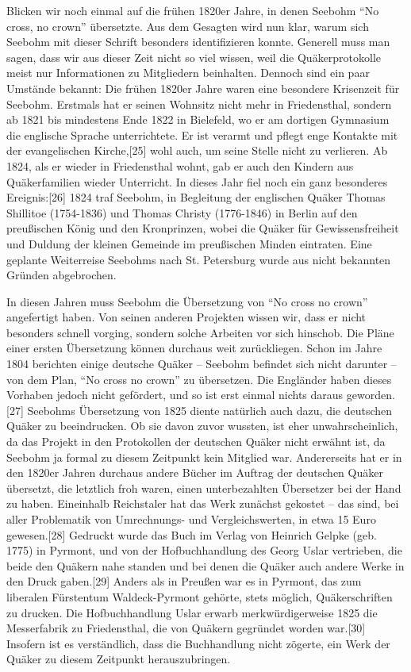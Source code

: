 \medskip

Blicken wir noch einmal auf die frühen 1820er Jahre, in denen Seebohm "`No
cross, no crown"' übersetzte. Aus dem Gesagten wird nun klar, warum sich Seebohm
mit dieser Schrift besonders identifizieren konnte. Generell muss man sagen,
dass wir aus dieser Zeit nicht so viel wissen, weil die Quäkerprotokolle meist
nur Informationen zu Mitgliedern beinhalten. Dennoch sind ein paar Umstände
bekannt: Die frühen 1820er Jahre waren eine besondere Krisenzeit für Seebohm.
Erstmals hat er seinen Wohnsitz nicht mehr in Friedensthal, sondern ab 1821 bis
mindestens Ende 1822 in Bielefeld, wo er am dortigen Gymnasium die englische
Sprache unterrichtete. Er ist verarmt und pflegt enge Kontakte mit der
evangelischen Kirche,[25] wohl auch, um seine Stelle nicht zu verlieren. Ab
1824, als er wieder in Friedensthal wohnt, gab er auch den Kindern aus
Quäkerfamilien wieder Unterricht. In dieses Jahr fiel noch ein ganz besonderes
Ereignis:[26] 1824 traf Seebohm, in Begleitung der englischen Quäker Thomas
Shillitoe (1754-1836) und Thomas Christy (1776-1846) in Berlin auf den
preußischen König und den Kronprinzen, wobei die Quäker für Gewissensfreiheit
und Duldung der kleinen Gemeinde im preußischen Minden eintraten. Eine geplante
Weiterreise Seebohms nach St. Petersburg wurde aus nicht bekannten Gründen
abgebrochen.

\medskip

In diesen Jahren muss Seebohm die Übersetzung von "`No cross no crown"'
angefertigt haben. Von seinen anderen Projekten wissen wir, dass er nicht
besonders schnell vorging, sondern solche Arbeiten vor sich hinschob. Die Pläne
einer ersten Übersetzung können durchaus weit zurückliegen. Schon im Jahre 1804
berichten einige deutsche Quäker – Seebohm befindet sich nicht darunter – von
dem Plan, "`No cross no crown"' zu übersetzen. Die Engländer haben dieses
Vorhaben jedoch nicht gefördert, und so ist erst einmal nichts daraus
geworden.[27] Seebohms Übersetzung von 1825 diente natürlich auch dazu, die
deutschen Quäker zu beeindrucken. Ob sie davon zuvor wussten, ist eher
unwahrscheinlich, da das Projekt in den Protokollen der deutschen Quäker nicht
erwähnt ist, da Seebohm ja formal zu diesem Zeitpunkt kein Mitglied war.
Andererseits hat er in den 1820er Jahren durchaus andere Bücher im Auftrag der
deutschen Quäker übersetzt, die letztlich froh waren, einen unterbezahlten
Übersetzer bei der Hand zu haben. Eineinhalb Reichstaler hat das Werk zunächst
gekostet – das sind, bei aller Problematik von Umrechnungs- und
Vergleichswerten, in etwa 15 Euro gewesen.[28] Gedruckt wurde das Buch im Verlag
von Heinrich Gelpke (geb. 1775) in Pyrmont, und von der Hofbuchhandlung des
Georg Uslar vertrieben, die beide den Quäkern nahe standen und bei denen die
Quäker auch andere Werke in den Druck gaben.[29] Anders als in Preußen war es in
Pyrmont, das zum liberalen Fürstentum Waldeck-Pyrmont gehörte, stets möglich,
Quäkerschriften zu drucken. Die Hofbuchhandlung Uslar erwarb merkwürdigerweise
1825 die Messerfabrik zu Friedensthal, die von Quäkern gegründet worden war.[30]
Insofern ist es verständlich, dass die Buchhandlung nicht zögerte, ein Werk der
Quäker zu diesem Zeitpunkt herauszubringen.

